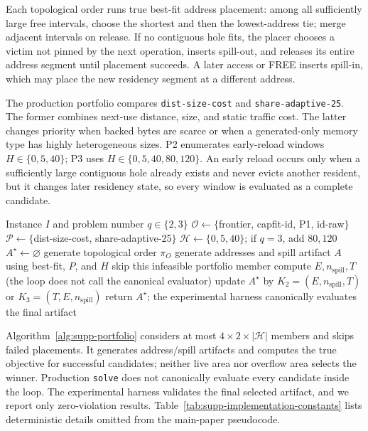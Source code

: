 Each topological order runs true best-fit address placement: among all sufficiently large free intervals, choose the shortest and then the lowest-address tie; merge adjacent intervals on release. If no contiguous hole fits, the placer chooses a victim not pinned by the next operation, inserts spill-out, and releases its entire address segment until placement succeeds. A later access or FREE inserts spill-in, which may place the new residency segment at a different address.

The production portfolio compares \texttt{dist-size-cost} and \texttt{share-adaptive-25}. The former combines next-use distance, size, and static traffic cost. The latter changes priority when backed bytes are scarce or when a generated-only memory type has highly heterogeneous sizes. P2 enumerates early-reload windows $H\in\{0,5,40\}$; P3 uses $H\in\{0,5,40,80,120\}$. An early reload occurs only when a sufficiently large contiguous hole already exists and never evicts another resident, but it changes later residency state, so every window is evaluated as a complete candidate.

\begin{algorithm}[H]
\caption{Bounded P2/P3 artifact portfolio}\label{alg:supp-portfolio}
\begin{algorithmic}[1]
\Require Instance $I$ and problem number $q\in\{2,3\}$
\State $\mathcal O\gets\{$frontier, capfit-id, P1, id-raw$\}$
\State $\mathcal P\gets\{$dist-size-cost, share-adaptive-25$\}$
\State $\mathcal H\gets\{0,5,40\}$; if $q=3$, add $80,120$
\State $A^\star\gets\varnothing$
  \State generate topological order $\pi_O$
  \State generate addresses and spill artifact $A$ using best-fit, $P$, and $H$
   \State skip this infeasible portfolio member \EndIf
  \State compute $E,n_{\mathrm{spill}},T$ (the loop does not call the canonical evaluator)
  \State update $A^\star$ by $K_2=(E,n_{\mathrm{spill}},T)$ or $K_3=(T,E,n_{\mathrm{spill}})$
\EndFor
\State return $A^\star$; the experimental harness canonically evaluates the final artifact
\end{algorithmic}
\end{algorithm}

Algorithm~\ref{alg:supp-portfolio} considers at most $4\times2\times|\mathcal H|$ members and skips failed placements. It generates address/spill artifacts and computes the true objective for successful candidates; neither live area nor overflow area selects the winner. Production \texttt{solve} does not canonically evaluate every candidate inside the loop. The experimental harness validates the final selected artifact, and we report only zero-violation results. Table~\ref{tab:supp-implementation-constants} lists deterministic details omitted from the main-paper pseudocode.

